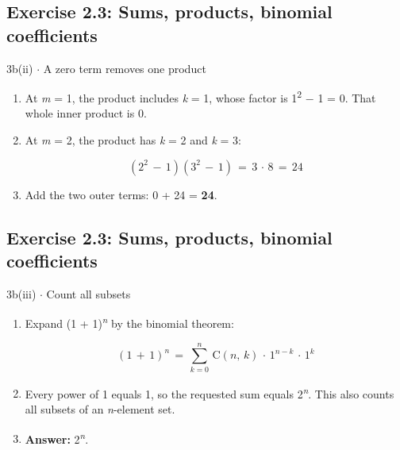 \documentclass[11pt]{article}
\begin{document}
\begin{keepsection}\subsection{Exercise 2.3: Sums, products, binomial coefficients}

\begin{workedbox}{3b(ii) \ensuremath{\cdot} A zero term removes one product}
\begin{enumerate}
\item At \textit{m} = 1, the product includes \textit{k} = 1, whose factor is 1\textsuperscript{2} \ensuremath{-} 1 = 0. That whole inner product is 0.
\item {}
At \textit{m} = 2, the product has \textit{k} = 2 and \textit{k} = 3:

\begin{equation*}(2^{2}\, -\, 1)(3^{2}\, -\, 1)\, =\, 3\, \cdot \, 8\, =\, 24\end{equation*}
\item Add the two outer terms: 0 + 24 = \textbf{24}.
\end{enumerate}
\end{workedbox}

\end{keepsection}
\begin{keepsection}\subsection{Exercise 2.3: Sums, products, binomial coefficients}

\begin{workedbox}{3b(iii) \ensuremath{\cdot} Count all subsets}
\begin{enumerate}
\item {}
Expand (1 + 1)\textsuperscript{\textit{n}} by the binomial theorem:

\begin{equation*}(1\, +\, 1)^{{n}}\, =\, \sum_{{k}=0}^{{n}} \, \mathrm{C}({n},\, {k})\, \cdot \, 1^{{n}-{k}}\, \cdot \, 1^{{k}}\end{equation*}
\item Every power of 1 equals 1, so the requested sum equals 2\textsuperscript{\textit{n}}. This also counts all subsets of an \textit{n}-element set.
\item \textbf{Answer:} 2\textsuperscript{\textit{n}}.
\end{enumerate}
\end{workedbox}

\end{keepsection}
\end{document}
